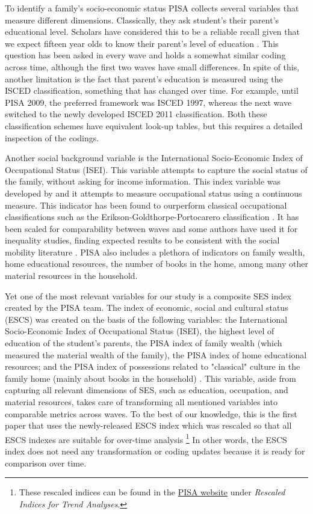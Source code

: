 \documentclass[11pt, a4paper]{article}\usepackage[]{graphicx}\usepackage[]{color}
\begin{document}
To identify a family's socio-economic status PISA collects several variables that measure different dimensions. Classically, they ask student's their parent's educational level. Scholars have considered this to be a reliable recall given that we expect fifteen year olds to know their parent's level of education \citep{reardon2011}. This question has been asked in every wave and holds a somewhat similar coding across time, although the first two waves have small differences. In spite of this, another limitation is the fact that parent's education is measured using the ISCED classification, something that has changed over time. For example, until PISA 2009, the preferred framework was ISCED 1997, whereas the next wave switched to the newly developed ISCED 2011 classification. Both these classification schemes have equivalent look-up tables, but this requires a detailed inspection of the codings.

Another social background variable is the International Socio-Economic Index of Occupational Status (ISEI). This variable attempts to capture the social status of the family, without asking for income information. This index variable was developed by \citet{ganzeboom1996, ganzeboom2010} and it attempts to measure occupational status using a continuous measure. This indicator has been found to ourperform classical occupational classifications such as the Erikson-Goldthorpe-Portocarero classification \citet{erikson1979}. It has been scaled for comparability between waves and some authors have used it for inequality studies, finding expected results to be consistent with the social mobility literature \citep{anna2016_global}. PISA also includes a plethora of indicators on family wealth, home educational resources, the number of books in the home, among many other material resources in the household.

Yet one of the most relevant variables for our study is a composite SES index created by the PISA team. The index of economic, social and cultural status (ESCS) was created on the basis of the following variables: the International Socio-Economic Index of Occupational Status (ISEI), the highest level of education of the student’s parents, the PISA index of family wealth (which measured the material wealth of the family), the PISA index of home educational resources; and the PISA index of possessions related to "classical" culture in the family home (mainly about books in the household) \citep{oecd_glance_2002}. This variable, aside from capturing all relevant dimensions of SES, such as education, occupation, and material resources, takes care of transforming all mentioned variables into comparable metrics across waves. To the best of our knowledge, this is the first paper that uses the newly-released ESCS index \citep{pisa_2015_results} which was rescaled so that all ESCS indexes are suitable for over-time analysis \footnote{These rescaled indices can be found in the \href{http://www.oecd.org/pisa/data/2015database/}{PISA website} under \emph{Rescaled Indices for Trend Analyses}.} In other words, the ESCS index does not need any transformation or coding updates because it is ready for comparison over time.
\end{document}
